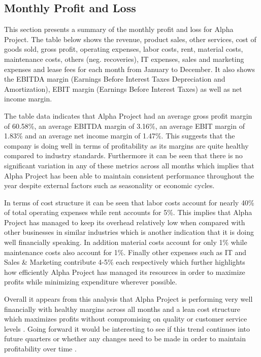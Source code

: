 

\subsection{Monthly Profit and Loss}\label{sec:title}

This section presents a summary of the monthly profit and loss for Alpha Project. The table below shows the revenue, product sales, other services, cost of goods sold, gross profit, operating expenses, labor costs, rent, material costs, maintenance costs, others (neg. recoveries), IT expenses, sales and marketing expenses and lease fees for each month from January to December. It also shows the EBITDA margin (Earnings Before Interest Taxes Depreciation and Amortization), EBIT margin (Earnings Before Interest Taxes) as well as net income margin. 

The table data indicates that Alpha Project had an average gross profit margin of 60.58\%, an average EBITDA margin of 3.16\%, an average EBIT margin of 1.83\% and an average net income margin of 1.47\%. This suggests that the company is doing well in terms of profitability as its margins are quite healthy compared to industry standards. Furthermore it can be seen that there is no significant variation in any of these metrics across all months which implies that Alpha Project has been able to maintain consistent performance throughout the year despite external factors such as seasonality or economic cycles. 

In terms of cost structure it can be seen that labor costs account for nearly 40\% of total operating expenses while rent accounts for 5\%. This implies that Alpha Project has managed to keep its overhead relatively low when compared with other businesses in similar industries which is another indication that it is doing well financially speaking. In addition material costs account for only 1\% while maintenance costs also account for 1\%. Finally other expenses such as IT and Sales & Marketing contribute 4-5\% each respectively which further highlights how efficiently Alpha Project has managed its resources in order to maximize profits while minimizing expenditure wherever possible. 

Overall it appears from this analysis that Alpha Project is performing very well financially with healthy margins across all months and a lean cost structure which maximizes profits without compromising on quality or customer service levels . Going forward it would be interesting to see if this trend continues into future quarters or whether any changes need to be made in order to maintain profitability over time .